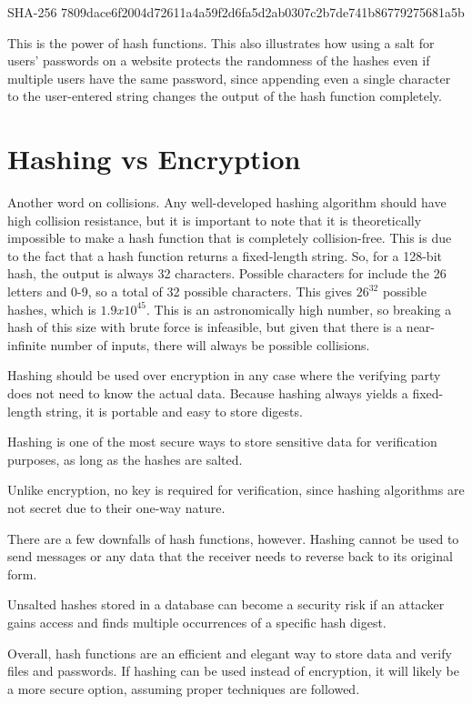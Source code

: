 \documentclass{article}
\begin{document}
SHA-256 7809dace6f2004d72611a4a59f2d6fa5d2ab0307c2b7de741b86779275681a5b

This is the power of hash functions. This also illustrates how using a salt for users' passwords on a website protects the randomness of the hashes even if multiple users have the same password, since appending even a single character to the user-entered string changes the output of the hash function completely.

\section{Hashing vs Encryption}
\tab Another word on collisions. Any well-developed hashing algorithm should have high collision resistance, but it is important to note that it is theoretically impossible to make a hash function that is completely collision-free. This is due to the fact that a hash function returns a fixed-length string. So, for a 128-bit hash, the output is always 32 characters. Possible characters for include the 26 letters and 0-9, so a total of 32 possible characters. This gives $26^{32}$ possible hashes, which is $1.9 x 10^{45}$. This is an astronomically high number, so breaking a hash of this size with brute force is infeasible, but given that there is a near-infinite number of inputs, there will always be possible collisions.  

Hashing should be used over encryption in any case where the verifying party does not need to know the actual data. Because hashing always yields a fixed-length string, it is portable and easy to store digests.

Hashing is one of the most secure ways to store sensitive data for verification purposes, as long as the hashes are salted. 

Unlike encryption, no key is required for verification, since hashing algorithms are not secret due to their one-way nature.

There are a few downfalls of hash functions, however. Hashing cannot be used to send messages or any data that the receiver needs to reverse back to its original form. 

Unsalted hashes stored in a database can become a security risk if an attacker gains access and finds multiple occurrences of a specific hash digest.

Overall, hash functions are an efficient and elegant way to store data and verify files and passwords. If hashing can be used instead of encryption, it will likely be a more secure option, assuming proper techniques are followed.
\end{document}
